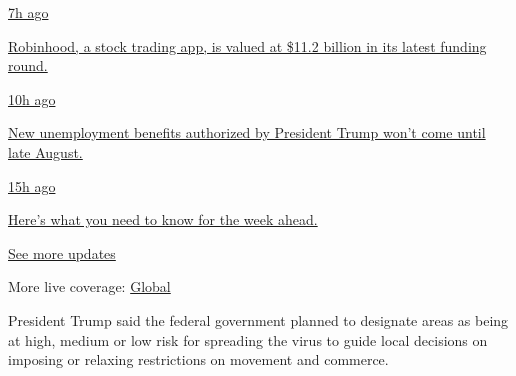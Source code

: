 \href{https://www.nytimes.com/live/2020/08/17/business/stock-market-today-coronavirus?action=click\&pgtype=Article\&state=default\&region=MAIN_CONTENT_1\&context=storylines_live_updates\#robinhood-a-stock-trading-app-is-valued-at-11-2-billion-in-its-latest-funding-round}{7h
ago}

\href{https://www.nytimes.com/live/2020/08/17/business/stock-market-today-coronavirus?action=click\&pgtype=Article\&state=default\&region=MAIN_CONTENT_1\&context=storylines_live_updates\#robinhood-a-stock-trading-app-is-valued-at-11-2-billion-in-its-latest-funding-round}{Robinhood,
a stock trading app, is valued at \$11.2 billion in its latest funding
round.}

\href{https://www.nytimes.com/live/2020/08/17/business/stock-market-today-coronavirus?action=click\&pgtype=Article\&state=default\&region=MAIN_CONTENT_1\&context=storylines_live_updates\#new-unemployment-benefits-authorized-by-president-trump-wont-come-until-late-august}{10h
ago}

\href{https://www.nytimes.com/live/2020/08/17/business/stock-market-today-coronavirus?action=click\&pgtype=Article\&state=default\&region=MAIN_CONTENT_1\&context=storylines_live_updates\#new-unemployment-benefits-authorized-by-president-trump-wont-come-until-late-august}{New
unemployment benefits authorized by President Trump won't come until
late August.}

\href{https://www.nytimes.com/live/2020/08/17/business/stock-market-today-coronavirus?action=click\&pgtype=Article\&state=default\&region=MAIN_CONTENT_1\&context=storylines_live_updates\#heres-what-you-need-to-know-for-the-week-ahead}{15h
ago}

\href{https://www.nytimes.com/live/2020/08/17/business/stock-market-today-coronavirus?action=click\&pgtype=Article\&state=default\&region=MAIN_CONTENT_1\&context=storylines_live_updates\#heres-what-you-need-to-know-for-the-week-ahead}{Here's
what you need to know for the week ahead.}

\href{https://www.nytimes.com/live/2020/08/17/business/stock-market-today-coronavirus?action=click\&pgtype=Article\&state=default\&region=MAIN_CONTENT_1\&context=storylines_live_updates}{See
more updates}

More live coverage:
\href{https://www.nytimes.com/2020/08/17/world/coronavirus-covid.html?action=click\&pgtype=Article\&state=default\&region=MAIN_CONTENT_1\&context=storylines_live_updates}{Global}

President Trump said the federal government planned to designate areas
as being at high, medium or low risk for spreading the virus to guide
local decisions on imposing or relaxing restrictions on movement and
commerce.

